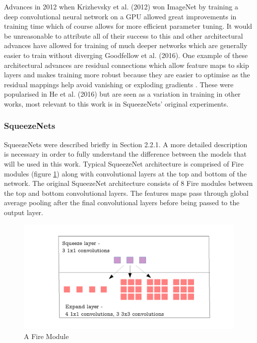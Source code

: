\documentclass{article}
\begin{document}
Advances in 2012 when  Krizhevsky et al. (2012) won ImageNet by training a deep convolutional neural network on a GPU allowed great improvements in training time which of course allows for more efficient parameter tuning. It would be unreasonable to attribute all of their success to this and other architectural advances have allowed for training of much deeper networks which are generally easier to train without diverging Goodfellow et al. (2016). One example of these architectural advances are residual connections which allow feature maps to skip layers and makes training more robust because they are easier to optimise as the residual mappings help avoid vanishing or exploding gradients . These were popularised in He et al. (2016) but are seen as a variation in training in other works, most relevant to this work is in SqueezeNets' original experiments.

\subsubsection{SqueezeNets}
SqueezeNets were described briefly in  Section 2.2.1. A more detailed description is necessary in order to fully understand the difference between the models that will be used in this work. Typical SqueezeNet architecture is comprised of Fire modules (figure \ref{fig:firemod}) along with convolutional layers at the top and bottom of the network. The original SqueezeNet architecture consists of 8 Fire modules between the top and bottom convolutional layers. The features maps pass through global average pooling after the final convolutional layers before being passed to the output layer.\\

\begin{figure}[!b]
  \includegraphics[width=\linewidth]{fire.pdf}
  \caption{A Fire Module}
  \label{fig:firemod}
\end{figure}
\end{document}
